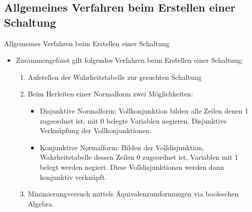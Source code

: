 \documentclass[12pt%
,xcolor=table
,aspectratio=169%
]{beamer}
\begin{document}
\subsection{Allgemeines Verfahren beim Erstellen einer Schaltung}
\begin{frame}{Allgemeines Verfahren beim Erstellen einer Schaltung}
\begin{itemize}
	\item Zusammengefasst gilt folgendes Verfahren beim Erstellen einer Schaltung:
	\begin{enumerate}
		\item Aufstellen der Wahrheitstabelle zur gesuchten Schaltung
		\item Beim Herleiten einer Normalform zwei Möglichkeiten:
		\begin{itemize}
			\item Disjunktive Normalform: Vollkonjunktion bilden alle Zeilen denen 1 zugeordnet ist, mit 0 belegte Variablen negieren. Disjunktive Verknüpfung der Vollkonjunktionen.
			\item Konjunktive Normalform: Bilden der Volldisjunktion, Wahrheitstabelle dessen Zeilen 0 zugeordnet ist, Variablen mit 1 belegt werden negiert. Diese Volldisjunktionen werden dann konjunktiv verknüpft.
		\end{itemize}
		\item Minimierungversuch mittels Äquivalenzumformungen via booleschen Algebra.
	\end{enumerate}
\end{itemize}
\end{frame}
\end{document}

